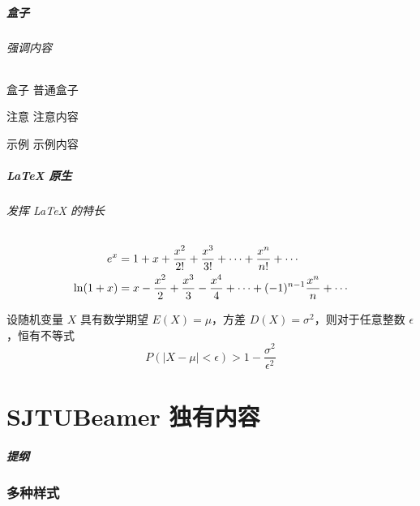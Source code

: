 \documentclass[
    aspectratio=169,  %
]{ctexbeamer}
\begin{document}
\begin{frame}
  \frametitle{盒子}
  \framesubtitle{强调内容}

  \begin{block}{盒子}
    普通盒子
  \end{block}
  \begin{alertblock}{注意}
    注意内容
  \end{alertblock}
  \begin{exampleblock}{示例}
    示例内容
  \end{exampleblock}
\end{frame}

\begin{frame}
  \frametitle{\LaTeX{} 原生}
  \framesubtitle{发挥 \LaTeX{} 的特长}

  \begin{align*}
    \mathnormal{e}^x & = 1+x+\frac{x^{2}}{2!}+\frac{x^{3}}{3!}+\cdots+\frac{x^{n}}{n!}+\cdots                    \\
    \ln (1+x)        & = x-\frac{x^{2}}{2}+\frac{x^{3}}{3}-\frac{x^{4}}{4}+\cdots+(-1)^{n-1}\frac{x^n}{n}+\cdots \\
  \end{align*}

  \begin{theorem}
    设随机变量 $X$ 具有数学期望 $E(X)=\mu$，方差 $D(X)=\sigma^2$，则对于任意整数
    $\epsilon$，恒有不等式
    \begin{equation}
      P\left(\lvert X-\mu\rvert<\epsilon\right)>1-\frac{\sigma^2}{\epsilon^2}
    \end{equation}
  \end{theorem}

\end{frame}

\part{SJTUBeamer 独有内容}

\begin{frame}
  \frametitle{提纲}
  \tableofcontents
\end{frame}

\section{多种样式}
\end{document}
